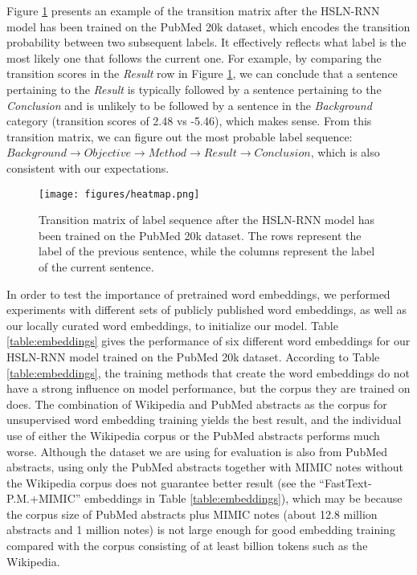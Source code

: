 \documentclass[11pt,a4paper]{article}
\begin{document}
Figure \ref{figure:heatmap} presents an example of the transition matrix after the HSLN-RNN model has been trained on the PubMed 20k dataset, which encodes the transition probability between two subsequent labels. It effectively reflects what label is the most likely one that follows the current one. For example, by comparing the transition scores in the \textit{Result} row in Figure \ref{figure:heatmap}, we can conclude that a sentence pertaining to the \textit{Result} is typically followed by a sentence pertaining to the \textit{Conclusion} and is unlikely to be followed by a sentence in the \textit{Background} category (transition scores of 2.48 vs -5.46), which makes sense. From this transition matrix, we can figure out the most probable label sequence: $Background\to Objective\to Method\to Result\to Conclusion$, which is also consistent with our expectations.


\begin{figure}[h!]
\begin{center}
\texttt{[image: figures/heatmap.png]}
\caption{Transition matrix of label sequence after the HSLN-RNN model has been trained on the PubMed 20k dataset. The rows represent the label of the previous sentence, while the columns represent the label of the current sentence.}
\label{figure:heatmap}
\end{center}
\end{figure}

In order to test the importance of pretrained word embeddings, we performed experiments with different sets of publicly published word embeddings, as well as our locally curated word embeddings, to initialize our model. Table \ref{table:embeddings} gives the performance of six different word embeddings for our HSLN-RNN model trained on the PubMed 20k dataset. According to Table \ref{table:embeddings}, the training methods that create the word embeddings do not have a strong influence on model performance, but the corpus they are trained on does. The combination of Wikipedia and PubMed abstracts as the corpus for unsupervised word embedding training yields the best result, and the individual use of either the Wikipedia corpus or the PubMed abstracts performs much worse. Although the dataset we are using for evaluation is also from PubMed abstracts, using only the PubMed abstracts together with MIMIC notes without the Wikipedia corpus does not guarantee better result (see the ``FastText-P.M.+MIMIC'' embeddings in Table \ref{table:embeddings}), which may be because the corpus size of PubMed abstracts plus MIMIC notes (about 12.8 million abstracts and 1 million notes) is not large enough for good embedding training compared with the corpus consisting of at least billion tokens such as the Wikipedia. 
\end{document}
